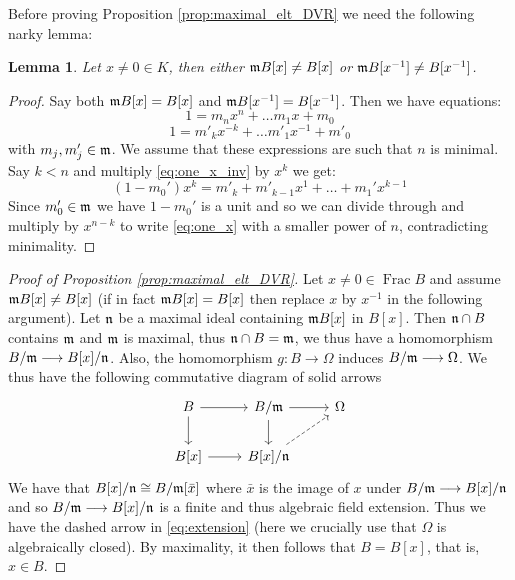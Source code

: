 \documentclass[12pt]{article}
\theoremstyle{plain}
\newtheorem{lemma}[thm]{Lemma}
\theoremstyle{definition}
\newcommand{\lto}{\longrightarrow}
\begin{document}
	Before proving Proposition \ref{prop:maximal_elt_DVR} we need the following narky lemma:
	\begin{lemma}
		\label{lem:narky} Let $x \neq 0 \in K$, then either $\frak{m}B[x] \neq B[x]$ or $\frak{m}B[x^{-1}] \neq B[x^{-1}]$.
	\end{lemma}
	\begin{proof}
		Say both $\frak{m}B[x] = B[x]$ and $\frak{m}B[x^{-1}] = B[x^{-1}]$. Then we have equations:
		\begin{equation}
			\label{eq:one_x}
			1 = m_nx^{n} + \hdots m_1x + m_0
		\end{equation}
		\begin{equation}
			\label{eq:one_x_inv}
			1 = m'_kx^{-k} + \hdots m'_1x^{-1} + m'_0
		\end{equation}
		with $m_j,m_j' \in \frak{m}$. We assume that these expressions are such that $n$ is minimal. Say $k < n$ and multiply \eqref{eq:one_x_inv} by $x^k$ we get:
		\begin{equation}
			\label{eq:one_x_inv_modified}
			(1 - m_0')x^k = m'_k + m'_{k-1}x^{1} + \hdots + m_1'x^{k-1}
		\end{equation}
		Since $m_0' \in \frak{m}$ we have $1 - m_0'$ is a unit and so we can divide through and multiply by $x^{n - k}$ to write \eqref{eq:one_x} with a smaller power of $n$, contradicting minimality.
	\end{proof}
	\begin{proof}[Proof of Proposition \ref{prop:maximal_elt_DVR}]
		Let $x \neq 0 \in \operatorname{Frac}B$ and assume $\frak{m}B[x] \neq B[x]$ (if in fact $\frak{m}B[x] = B[x]$ then replace $x$ by $x^{-1}$ in the following argument). Let $\frak{n}$ be a maximal ideal containing $\frak{m}B[x]$ in $B[x]$. Then $\frak{n} \cap B$ contains $\frak{m}$ and $\frak{m}$ is maximal, thus $\frak{n} \cap B = \frak{m}$, we thus have a homomorphism $B/\frak{m} \lto B[x]/\frak{n}$. Also, the homomorphism $g: B \lto \Omega$ induces $B/\frak{m} \lto \Omega$. We thus have the following commutative diagram of solid arrows
		\begin{equation}
			\label{eq:extension}
			\begin{tikzcd}
				B\arrow[r]\arrow[d] & B/\frak{m}\arrow[r]\arrow[d] & \Omega\\
				B[x]\arrow[r] & B[x]/\frak{n}\arrow[ur,dashed]
			\end{tikzcd}
		\end{equation}
		We have that $B[x]/\frak{n} \cong B/\frak{m}[\bar{x}]$ where $\bar{x}$ is the image of $x$ under $B/\frak{m} \lto B[x]/\frak{n}$ and so $B/\frak{m} \lto B[x]/\frak{n}$ is a finite and thus algebraic field extension. Thus we have the dashed arrow in \eqref{eq:extension} (here we crucially use that $\Omega$ is algebraically closed). By maximality, it then follows that $B = B[x]$, that is, $x \in B$.
	\end{proof}
\end{document}
